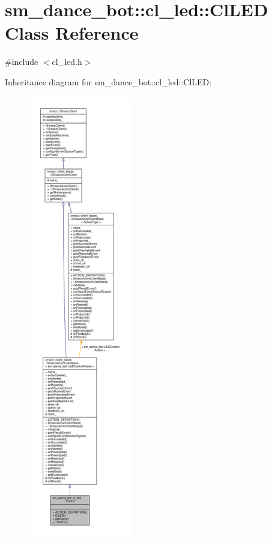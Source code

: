 \hypertarget{classsm__dance__bot_1_1cl__led_1_1ClLED}{}\section{sm\+\_\+dance\+\_\+bot\+:\+:cl\+\_\+led\+:\+:Cl\+L\+ED Class Reference}
\label{classsm__dance__bot_1_1cl__led_1_1ClLED}


{\ttfamily \#include $<$cl\+\_\+led.\+h$>$}



Inheritance diagram for sm\+\_\+dance\+\_\+bot\+:\+:cl\+\_\+led\+:\+:Cl\+L\+ED\+:\nopagebreak
\begin{figure}[H]
\begin{center}
\leavevmode
\includegraphics[height=550pt]{classsm__dance__bot_1_1cl__led_1_1ClLED__inherit__graph}
\end{center}
\end{figure}


